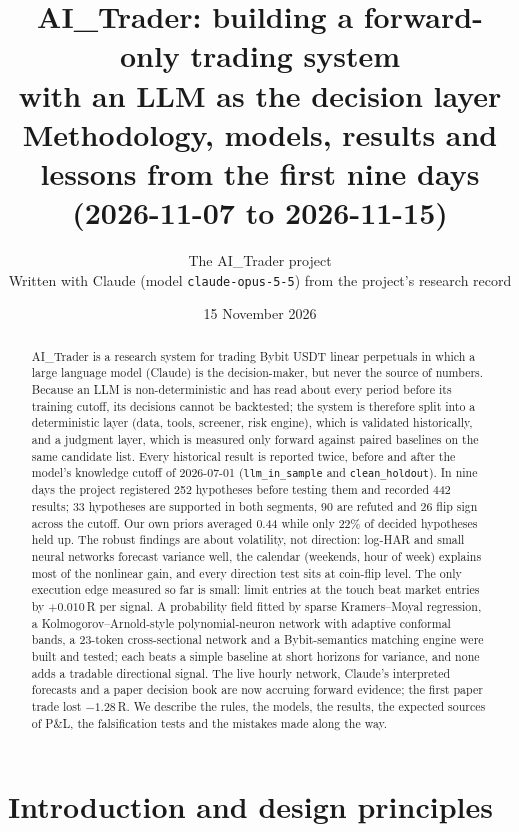 \documentclass[10pt,a4paper]{article}
\title{\textbf{AI\_Trader: building a forward-only trading system\\with an LLM as the decision layer}\\[0.4em]
\large Methodology, models, results and lessons from the first nine days (2026-11-07 to 2026-11-15)}
\author{The AI\_Trader project\\[0.2em]\small Written with Claude (model \texttt{claude-opus-5-5}) from the project's research record}
\date{15 November 2026}
\newcommand{\seg}[1]{\texttt{#1}}
\begin{document}
\maketitle

\begin{abstract}
\noindent
AI\_Trader is a research system for trading Bybit USDT linear perpetuals in which a large language model (Claude) is the decision-maker, but never the source of numbers. Because an LLM is non-deterministic and has read about every period before its training cutoff, its decisions cannot be backtested; the system is therefore split into a deterministic layer (data, tools, screener, risk engine), which is validated historically, and a judgment layer, which is measured only forward against paired baselines on the same candidate list. Every historical result is reported twice, before and after the model's knowledge cutoff of 2026-07-01 (\seg{llm\_in\_sample} and \seg{clean\_holdout}). In nine days the project registered 252 hypotheses before testing them and recorded 442 results; 33 hypotheses are supported in both segments, 90 are refuted and 26 flip sign across the cutoff. Our own priors averaged 0.44 while only 22\% of decided hypotheses held up. The robust findings are about volatility, not direction: log-HAR and small neural networks forecast variance well, the calendar (weekends, hour of week) explains most of the nonlinear gain, and every direction test sits at coin-flip level. The only execution edge measured so far is small: limit entries at the touch beat market entries by $+0.010$\,R per signal. A probability field fitted by sparse Kramers--Moyal regression, a Kolmogorov--Arnold-style polynomial-neuron network with adaptive conformal bands, a 23-token cross-sectional network and a Bybit-semantics matching engine were built and tested; each beats a simple baseline at short horizons for variance, and none adds a tradable directional signal. The live hourly network, Claude's interpreted forecasts and a paper decision book are now accruing forward evidence; the first paper trade lost $-1.28$\,R. We describe the rules, the models, the results, the expected sources of P\&L, the falsification tests and the mistakes made along the way.
\end{abstract}


\section{Introduction and design principles}
\end{document}
